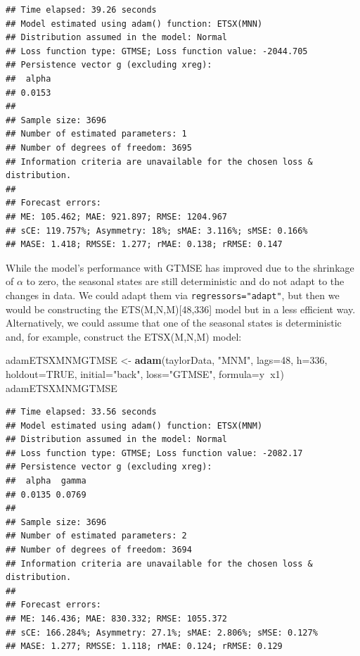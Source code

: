 \documentclass[]{book}
\newenvironment{Shaded}{\begin{snugshade}}{\end{snugshade}}
\newcommand{\DataTypeTok}[1]{\textcolor[rgb]{0.13,0.29,0.53}{#1}}
\newcommand{\DecValTok}[1]{\textcolor[rgb]{0.00,0.00,0.81}{#1}}
\newcommand{\KeywordTok}[1]{\textcolor[rgb]{0.13,0.29,0.53}{\textbf{#1}}}
\newcommand{\NormalTok}[1]{#1}
\newcommand{\OperatorTok}[1]{\textcolor[rgb]{0.81,0.36,0.00}{\textbf{#1}}}
\newcommand{\OtherTok}[1]{\textcolor[rgb]{0.56,0.35,0.01}{#1}}
\newcommand{\StringTok}[1]{\textcolor[rgb]{0.31,0.60,0.02}{#1}}
\theoremstyle{definition}
\theoremstyle{definition}
\theoremstyle{definition}
\theoremstyle{definition}
\theoremstyle{remark}
\begin{document}
\begin{verbatim}
## Time elapsed: 39.26 seconds
## Model estimated using adam() function: ETSX(MNN)
## Distribution assumed in the model: Normal
## Loss function type: GTMSE; Loss function value: -2044.705
## Persistence vector g (excluding xreg):
##  alpha 
## 0.0153 
## 
## Sample size: 3696
## Number of estimated parameters: 1
## Number of degrees of freedom: 3695
## Information criteria are unavailable for the chosen loss & distribution.
## 
## Forecast errors:
## ME: 105.462; MAE: 921.897; RMSE: 1204.967
## sCE: 119.757%; Asymmetry: 18%; sMAE: 3.116%; sMSE: 0.166%
## MASE: 1.418; RMSSE: 1.277; rMAE: 0.138; rRMSE: 0.147
\end{verbatim}

While the model's performance with GTMSE has improved due to the shrinkage of \(\alpha\) to zero, the seasonal states are still deterministic and do not adapt to the changes in data. We could adapt them via \texttt{regressors="adapt"}, but then we would be constructing the ETS(M,N,M){[}48,336{]} model but in a less efficient way. Alternatively, we could assume that one of the seasonal states is deterministic and, for example, construct the ETSX(M,N,M) model:

\begin{Shaded}
\begin{Highlighting}[]
\NormalTok{adamETSXMNMGTMSE <-}\StringTok{ }\KeywordTok{adam}\NormalTok{(taylorData, }\StringTok{"MNM"}\NormalTok{, }\DataTypeTok{lags=}\DecValTok{48}\NormalTok{,}
                         \DataTypeTok{h=}\DecValTok{336}\NormalTok{, }\DataTypeTok{holdout=}\OtherTok{TRUE}\NormalTok{,}
                         \DataTypeTok{initial=}\StringTok{"back"}\NormalTok{, }\DataTypeTok{loss=}\StringTok{"GTMSE"}\NormalTok{,}
                         \DataTypeTok{formula=}\NormalTok{y}\OperatorTok{~}\NormalTok{x1)}
\NormalTok{adamETSXMNMGTMSE}
\end{Highlighting}
\end{Shaded}

\begin{verbatim}
## Time elapsed: 33.56 seconds
## Model estimated using adam() function: ETSX(MNM)
## Distribution assumed in the model: Normal
## Loss function type: GTMSE; Loss function value: -2082.17
## Persistence vector g (excluding xreg):
##  alpha  gamma 
## 0.0135 0.0769 
## 
## Sample size: 3696
## Number of estimated parameters: 2
## Number of degrees of freedom: 3694
## Information criteria are unavailable for the chosen loss & distribution.
## 
## Forecast errors:
## ME: 146.436; MAE: 830.332; RMSE: 1055.372
## sCE: 166.284%; Asymmetry: 27.1%; sMAE: 2.806%; sMSE: 0.127%
## MASE: 1.277; RMSSE: 1.118; rMAE: 0.124; rRMSE: 0.129
\end{verbatim}
\end{document}
